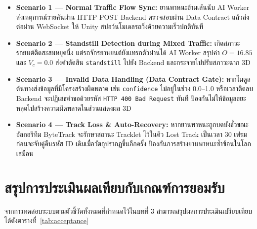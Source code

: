 \documentclass[12pt,a4paper]{report}
\begin{document}
\begin{itemize}
  \item \textbf{Scenario 1 --- Normal Traffic Flow Sync:}
        ยานพาหนะข้ามเส้นนับ
        AI Worker ส่งเหตุการณ์รายคันผ่าน HTTP POST
        Backend ตรวจสอบผ่าน Data Contract แล้วส่งต่อผ่าน WebSocket
        ให้ Unity สปอว์นโมเดลรถวิ่งด้วยความเร็วปกติทันที

  \item \textbf{Scenario 2 --- Standstill Detection during Mixed Traffic:}
        เกิดสภาวะรถยนต์ติดสะสมหยุดนิ่ง แต่รถจักรยานยนต์ยังแทรกตัวผ่านได้
        AI Worker สรุปค่า $O = 16.85$ และ $V_c = 0.0$
        ส่งคำตัดสิน \texttt{standstill} ไปยัง Backend
        และกระจายไปปรับสภาวะฉาก 3D

  \item \textbf{Scenario 3 --- Invalid Data Handling (Data Contract Gate):}
        หากโมดูลต้นทางส่งข้อมูลที่มีโครงสร้างผิดพลาด
        เช่น \texttt{confidence} ไม่อยู่ในช่วง 0.0--1.0 หรือเวลาติดลบ
        Backend จะปฏิเสธคำขอด้วยรหัส \texttt{HTTP 400 Bad Request} ทันที
        ป้องกันไม่ให้ข้อมูลขยะหลุดไปสร้างความผิดพลาดในส่วนแสดงผล 3D

  \item \textbf{Scenario 4 --- Track Loss \& Auto-Recovery:}
        หากยานพาหนะถูกบดบังชั่วขณะ
        อัลกอริทึม ByteTrack จะรักษาสถานะ Tracklet ไว้ในคิว Lost Track
        เป็นเวลา 30 เฟรม ก่อนจะจับคู่คืนรหัส ID เดิมเมื่อวัตถุปรากฏขึ้นอีกครั้ง
        ป้องกันการสร้างยานพาหนะซ้ำซ้อนในโลกเสมือน
\end{itemize}

\section{สรุปการประเมินผลเทียบกับเกณฑ์การยอมรับ}
\label{sec:summary}

จากการทดสอบระบบตามตัวชี้วัดทั้งหมดที่กำหนดไว้ในบทที่ 3
สามารถสรุปผลการประเมินเปรียบเทียบได้ดังตารางที่~\ref{tab:acceptance}
\end{document}
